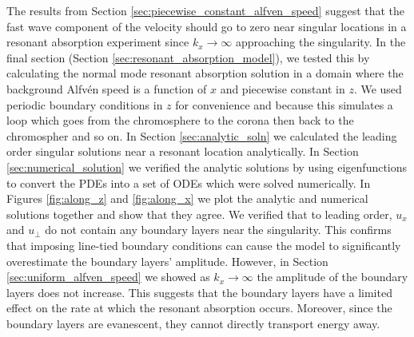 \documentclass[linenumbers]{aastex63}
\begin{document}
The results from Section \ref{sec:piecewise_constant_alfven_speed} suggest that the fast wave component of the velocity should go to zero near singular locations in a resonant absorption experiment since $k_x\rightarrow \infty$ approaching the singularity. In the final section (Section \ref{sec:resonant_absorption_model}), we tested this by calculating the normal mode resonant absorption solution in a domain where the background Alfv\'en speed is a function of $x$ and piecewise constant in $z$. We used periodic boundary conditions in $z$ for convenience and because this simulates a loop which goes from the chromosphere to the corona then back to the chromospher and so on. In Section \ref{sec:analytic_soln} we calculated the leading order singular solutions near a resonant location analytically. In Section \ref{sec:numerical_solution} we verified the analytic solutions by using eigenfunctions to convert the PDEs into a set of ODEs which were solved numerically. In Figures \ref{fig:along_z} and \ref{fig:along_x} we plot the analytic and numerical solutions together and show that they agree. We verified that to leading order, $u_x$ and $u_\perp$ do not contain any boundary layers near the singularity. This confirms that imposing line-tied boundary conditions can cause the model to significantly overestimate the boundary layers' amplitude. However, in Section \ref{sec:uniform_alfven_speed} we showed as $k_x\rightarrow\infty$ the amplitude of the boundary layers does not increase. This suggests that the boundary layers have a limited effect on the rate at which the resonant absorption occurs. Moreover, since the boundary layers are evanescent, they cannot directly transport energy away.
\end{document}
